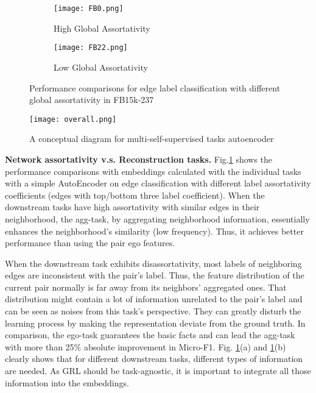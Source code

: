 \documentclass[10pt,journal,compsoc]{IEEEtran}
\begin{document}
\begin{figure}[htb]
\centering
\begin{subfigure}{0.495\columnwidth}
\centering
\texttt{[image: FB0.png]}
\caption{High Global Assortativity}
\end{subfigure}
\begin{subfigure}{0.495\columnwidth}
\centering
\texttt{[image: FB22.png]}

 \caption{Low Global Assortativity}
\end{subfigure}
\caption{Performance comparisons for edge label classification with different global assortativity in FB15k-237}
\label{fig:ass_task}
\end{figure}



\begin{figure*}[ht]
\centering
\texttt{[image: overall.png]}
\caption{A conceptual diagram for multi-self-supervised tasks autoencoder}
\label{fig:diagram}
\end{figure*}

\noindent\textbf{Network assortativity v.s. Reconstruction tasks.} Fig.\ref{fig:ass_task} shows the performance comparisons with embeddings calculated with the individual tasks with a simple AutoEncoder on edge classification with different label assortativity coefficients (edges with top/bottom three label coefficient). When the downstream tasks have high assortativity with similar edges in their neighborhood, the agg-task, by aggregating neighborhood information, essentially enhances the neighborhood's similarity (low frequency). Thus, it achieves better performance than using the pair ego features. 


When the downstream task exhibits disassortativity, most labels of neighboring edges are inconsistent with the pair's label. Thus, the feature distribution of the current pair normally is far away from its neighbors' aggregated ones. That distribution might contain a lot of information unrelated to the pair's label and can be seen as noises from this task's perspective. They can greatly disturb the learning process by making the representation deviate from the ground truth. In comparison, the ego-task guarantees the basic facts and can lead the agg-task with more than 25\% absolute improvement in Micro-F1. Fig. \ref{fig:ass_task}(a) and \ref{fig:ass_task}(b) clearly shows that for different downstream tasks, different types of information are needed. As GRL should be task-agnostic, it is important to integrate all those information into the embeddings. 
\end{document}
